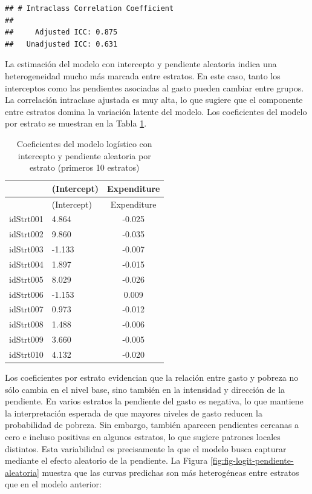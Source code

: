 \documentclass[
  spanish,
  12pt,
]{book}
\newenvironment{Shaded}{\begin{snugshade}}{\end{snugshade}}
\newcommand{\DataTypeTok}[1]{\textcolor[rgb]{0.13,0.29,0.53}{#1}}
\newcommand{\DecValTok}[1]{\textcolor[rgb]{0.00,0.00,0.81}{#1}}
\newcommand{\FunctionTok}[1]{\textcolor[rgb]{0.13,0.29,0.53}{\textbf{#1}}}
\newcommand{\NormalTok}[1]{#1}
\newcommand{\SpecialCharTok}[1]{\textcolor[rgb]{0.81,0.36,0.00}{\textbf{#1}}}
\begin{document}
\begin{verbatim}
## # Intraclass Correlation Coefficient
## 
##     Adjusted ICC: 0.875
##   Unadjusted ICC: 0.631
\end{verbatim}

La estimación del modelo con intercepto y pendiente aleatoria indica una heterogeneidad mucho más marcada entre estratos. En este caso, tanto los interceptos como las pendientes asociadas al gasto pueden cambiar entre grupos. La correlación intraclase ajustada es muy alta, lo que sugiere que el componente entre estratos domina la variación latente del modelo. Los coeficientes del modelo por estrato se muestran en la Tabla \ref{tab:tab-coef-logit-pendiente}.

\begin{Shaded}
\end{Shaded}

\begin{longtable}[]{@{}llc@{}}
\caption{\label{tab:tab-coef-logit-pendiente}Coeficientes del modelo logístico con intercepto y pendiente aleatoria por estrato (primeros 10 estratos)}\tabularnewline
\toprule\noalign{}
& (Intercept) & Expenditure \\
\midrule\noalign{}
\endfirsthead
\toprule\noalign{}
& (Intercept) & Expenditure \\
\midrule\noalign{}
\endhead
\bottomrule\noalign{}
\endlastfoot
idStrt001 & 4.864 & -0.025 \\
idStrt002 & 9.860 & -0.035 \\
idStrt003 & -1.133 & -0.007 \\
idStrt004 & 1.897 & -0.015 \\
idStrt005 & 8.029 & -0.026 \\
idStrt006 & -1.153 & 0.009 \\
idStrt007 & 0.973 & -0.012 \\
idStrt008 & 1.488 & -0.006 \\
idStrt009 & 3.660 & -0.005 \\
idStrt010 & 4.132 & -0.020 \\
\end{longtable}

Los coeficientes por estrato evidencian que la relación entre gasto y pobreza no sólo cambia en el nivel base, sino también en la intensidad y dirección de la pendiente. En varios estratos la pendiente del gasto es negativa, lo que mantiene la interpretación esperada de que mayores niveles de gasto reducen la probabilidad de pobreza. Sin embargo, también aparecen pendientes cercanas a cero e incluso positivas en algunos estratos, lo que sugiere patrones locales distintos. Esta variabilidad es precisamente la que el modelo busca capturar mediante el efecto aleatorio de la pendiente. La Figura \ref{fig:fig-logit-pendiente-aleatoria} muestra que las curvas predichas son más heterogéneas entre estratos que en el modelo anterior:
\end{document}
